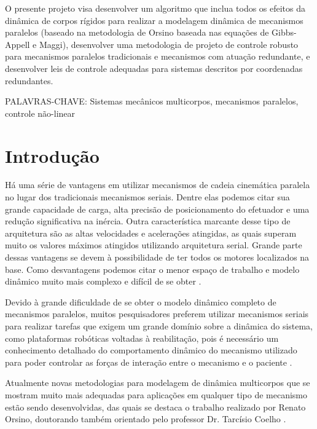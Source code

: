 \documentclass[a4paper,11pt,brazil,fleqn]{article}
\begin{document}
O presente projeto visa desenvolver um algoritmo que inclua todos os efeitos da din\^amica de corpos r\'igidos para realizar a modelagem din\^amica de mecanismos paralelos (baseado na metodologia de Orsino baseada nas equa\c{c}\~oes de Gibbs-Appell e Maggi), desenvolver uma metodologia de projeto de controle robusto para mecanismos paralelos tradicionais e mecanismos com atua\c{c}\~ao redundante, e desenvolver leis de controle adequadas para sistemas descritos por coordenadas redundantes.

\vspace{10pt}

\noindent
PALAVRAS-CHAVE: {Sistemas mec\^anicos multicorpos, mecanismos paralelos, controle n\~ao-linear}






\newpage
\section{Introdu\c{c}\~ao}\label{S01}

H\'a uma s\'erie de vantagens em utilizar mecanismos de cadeia cinem\'atica paralela no lugar dos tradicionais mecanismos seriais. Dentre elas podemos citar sua grande capacidade de carga, alta precis\~ao de posicionamento do efetuador e uma redu\c{c}\~ao significativa na in\'ercia. Outra caracter\'istica marcante desse tipo de arquitetura s\~ao as altas velocidades e acelera\c{c}\~oes atingidas, as quais superam muito os valores m\'aximos atingidos utilizando arquitetura serial. Grande parte dessas vantagens se devem à possibilidade de ter todos os motores localizados na base. Como desvantagens podemos citar o menor espa\c{c}o de trabalho e modelo din\^amico muito mais complexo e dif\'icil de se obter \cite{Merlet2002, Rynaldo}. 

	Devido à grande dificuldade de se obter o modelo din\^amico completo de mecanismos paralelos, muitos pesquisadores preferem utilizar mecanismos seriais para realizar tarefas que exigem um grande dom\'inio sobre a din\^amica do sistema, como plataformas rob\'oticas voltadas \`a reabilita\c{c}\~ao, pois \'e necess\'ario um conhecimento detalhado do comportamento din\^amico do mecanismo utilizado para poder controlar as for\c{c}as de intera\c{c}\~ao entre o mecanismo e o paciente \cite{Andre, Andre2}.
	
	Atualmente novas metodologias para modelagem de din\^amica multicorpos que se mostram muito mais adequadas para aplica\c{c}\~oes em qualquer tipo de mecanismo est\~ao sendo desenvolvidas, das quais se destaca o trabalho realizado por Renato Orsino, doutorando tamb\'em orientado pelo professor Dr. Tarc\'isio Coelho \cite{Orsino2013, Apostila}.
	
\end{document}
